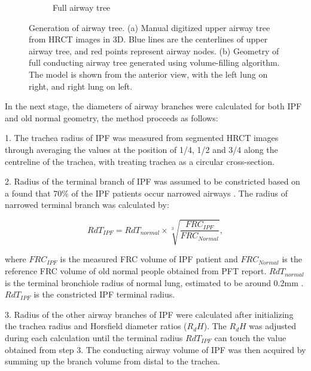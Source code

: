 \begin{figure}[htbp]
\begin{subfigure}{.425\linewidth}
  \caption{Full airway tree}
  \label{fig:AirwayGeneration-b} 
\end{subfigure}
\caption{Generation of airway tree. (a) Manual digitized upper airway tree from HRCT images in 3D. Blue lines are the centerlines of upper airway tree, and red points represent airway nodes. (b) Geometry of full conducting airway tree generated using volume-filling algorithm. The
model is shown from the anterior view, with the left lung on right, and right lung on left.} 
\label{fig:AirwayGeneration}
\end{figure}

In the next stage, the diameters of airway branches were calculated for both IPF and old normal geometry, the method proceeds as follows:

1. The trachea radius of IPF was measured from segmented HRCT images through averaging the values at the position of 1/4, 1/2 and 3/4 along the centreline of the trachea, with treating trachea as a circular cross-section.

2. Radius of the terminal branch of IPF was assumed to be constricted based on a found that 70\% of the IPF patients occur narrowed airways \citep{crystal1976idiopathic}. The radius of narrowed terminal branch was calculated by:

\begin{equation}
 \label{eq:NarrowedTerminalRadius}
 RdT_{IPF} = RdT_{normal} \times \sqrt[3]{\frac{FRC_{IPF}}{FRC_{Normal}}},
\end{equation}

\noindent where $FRC_{IPF}$ is the measured FRC volume of IPF patient and $FRC_{Normal}$ is the reference FRC volume of old normal people obtained from PFT report. $RdT_{normal}$ is the terminal bronchiole radius of normal lung, estimated to be around 0.2mm \citep{horsfield1976diameter}. $RdT_{IPF}$ is the constricted IPF terminal radius. 

3. Radius of the other airway branches of IPF were calculated after initializing the trachea radius and Horsfield diameter ratios ($R_dH$). The $R_dH$ was adjusted during each calculation until the terminal radius $RdT_{IPF}$ can touch the value obtained from step 3. The conducting airway volume of IPF was then acquired by summing up the branch volume from distal to the trachea.

